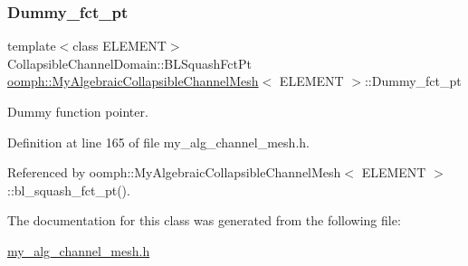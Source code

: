 \subsubsection{\texorpdfstring{Dummy\+\_\+fct\+\_\+pt}{Dummy\_fct\_pt}}
{\footnotesize\ttfamily template$<$class E\+L\+E\+M\+E\+NT$>$ \\
Collapsible\+Channel\+Domain\+::\+B\+L\+Squash\+Fct\+Pt \hyperlink{classoomph_1_1MyAlgebraicCollapsibleChannelMesh}{oomph\+::\+My\+Algebraic\+Collapsible\+Channel\+Mesh}$<$ E\+L\+E\+M\+E\+NT $>$\+::Dummy\+\_\+fct\+\_\+pt\hspace{0.3cm}{\ttfamily [protected]}}



Dummy function pointer. 



Definition at line 165 of file my\+\_\+alg\+\_\+channel\+\_\+mesh.\+h.



Referenced by oomph\+::\+My\+Algebraic\+Collapsible\+Channel\+Mesh$<$ E\+L\+E\+M\+E\+N\+T $>$\+::bl\+\_\+squash\+\_\+fct\+\_\+pt().



The documentation for this class was generated from the following file\+:\begin{DoxyCompactItemize}
\item 
\hyperlink{my__alg__channel__mesh_8h}{my\+\_\+alg\+\_\+channel\+\_\+mesh.\+h}\end{DoxyCompactItemize}
